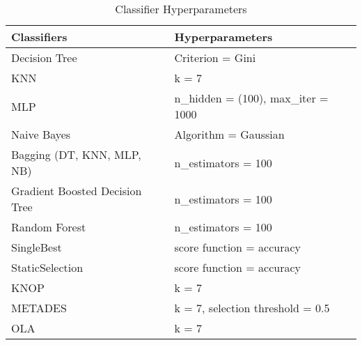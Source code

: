\begin{table}
    \centering
    \caption{Classifier Hyperparameters}\label{tb:hiperparameters}
    \begin{tabular}{l l}
    \toprule
    Classifiers & Hyperparameters\\
    \midrule
    Decision Tree & Criterion = Gini\\
    KNN & k = 7\\ 
    MLP & n\_hidden = (100), max\_iter = 1000\\
    Naive Bayes & Algorithm = Gaussian\\
    \hline
    Bagging (DT, KNN, MLP, NB) &  n\_estimators = 100\\
    \hline
    Gradient Boosted Decision Tree & n\_estimators = 100\\
    Random Forest & n\_estimators = 100\\
    SingleBest & score function = accuracy\\
    StaticSelection & score function = accuracy\\
    \hline
    KNOP & k = 7\\
    METADES & k = 7, selection threshold = 0.5\\
    OLA & k = 7\\
    \bottomrule
    \end{tabular}
\end{table}
    